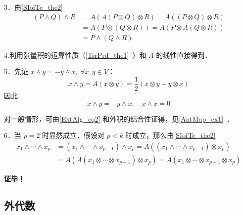 3．由\autoref{SIofTe_the2}~
\begin{equation}
\begin{aligned}
(P\wedge Q)\wedge R&=A(A(P\otimes Q)\otimes R)=A((P\otimes Q)\otimes R)\\
&=A(P\otimes (Q\otimes R))=A(P\otimes A(Q\otimes R))\\
&=P\wedge (Q\wedge R)
\end{aligned}
\end{equation}

4.利用张量积的运算性质（\autoref{TsrPrd_the1}~）和 $A$ 的线性直接得到．

5．先证 $x\wedge y=-y\wedge x,\;\forall x,y\in V$：
\begin{equation}
x\wedge y=A(x\otimes y)=\frac{1}{2}(x\otimes y-y\otimes x)
\end{equation}
因此
\begin{equation}\label{ExtAlg_eq2}
x\wedge y=-y\wedge x,\quad x\wedge x=0
\end{equation}

对一般情形，可由\autoref{ExtAlg_eq2} 和外积的结合性证得，见\autoref{AntMap_ex1}~．

6．当 $p=2$ 时显然成立．假设对 $p<k$ 时成立，那么由\autoref{SIofTe_the2}~
\begin{equation}
\begin{aligned}
x_1\wedge\cdots\wedge x_p&=(x_1\wedge\cdots\wedge x_{p-1})\wedge x_p=A((x_1\wedge\cdots\wedge x_{p-1})\otimes x_p)\\
&=A(A(x_1\otimes\cdots\otimes x_{p-1})\otimes x_p)=A(x_1\otimes\cdots\otimes x_{p-1}\otimes x_p)
\end{aligned}
\end{equation}

\textbf{证毕！}

\subsection{外代数}

